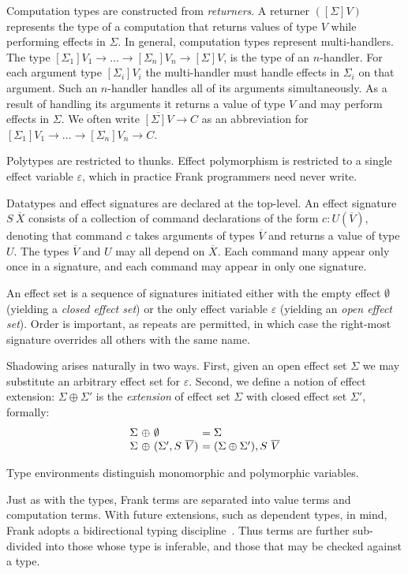\documentclass[preprint]{sigplanconf}
\newcommand{\many}{\overline}
\newcommand\ba{\begin{array}}
\newcommand\ea{\end{array}}
\newcommand{\sig}{S}
\newcommand{\sigs}{\Sigma}
\newcommand{\effbox}[1]{[#1]}
\begin{document}
Computation types are constructed from \emph{returners}.  A returner
$(\effbox{\sigs}V)$ represents the type of a computation that returns
values of type $V$ while performing effects in $\sigs$.
%
In general, computation types represent multi-handlers. The type
$\effbox{\sigs_1}V_1 \to \dots \to \effbox{\sigs_n}V_n \to
\effbox{\sigs}V$,
%
is the type of an $n$-handler. For each argument type
$\effbox{\sigs_i}V_i$ the multi-handler must handle effects in
$\sigs_i$ on that argument. Such an $n$-handler handles all of its
arguments simultaneously. As a result of handling its arguments it
returns a value of type $V$ and may perform effects in $\sigs$.
%
We often write $\many{\effbox{\sigs}V} \to C$ as an abbreviation for
$\effbox{\sigs_1}V_1 \to \dots \to \effbox{\sigs_n}V_n \to C$.

Polytypes are restricted to thunks. Effect polymorphism is restricted
to a single effect variable $\varepsilon$, which in practice Frank
programmers need never write.

Datatypes and effect signatures are declared at the top-level. An
effect signature $S~\many{X}$ consists of a collection of command
declarations of the form $c:U(\many{V})$, denoting that command $c$
takes arguments of types $\many{V}$ and returns a value of type
$U$. The types $\many{V}$ and $U$ may all depend on $\many{X}$. Each
command many appear only once in a signature, and each command may
appear in only one signature.

An effect set is a sequence of signatures initiated either with the
empty effect $\emptyset$ (yielding a \emph{closed effect set}) or the
only effect variable $\varepsilon$ (yielding an \emph{open effect
  set}). Order is important, as repeats are permitted, in which case
the right-most signature overrides all others with the same name.

Shadowing arises naturally in two ways. First, given an open effect
set $\sigs$ we may substitute an arbitrary effect set for
$\varepsilon$. Second, we define a notion of effect extension: $\sigs
\oplus \sigs'$ is the \emph{extension} of effect set $\sigs$ with
closed effect set $\sigs'$, formally:
%
\[\ba{@{\sigs~\oplus~}l@{~}l@{}}
\emptyset               &= \sigs \\
(\sigs', \sig~\many{V}) &= (\sigs \oplus \sigs'), \sig~\many{V} \\
\ea\]

Type environments distinguish monomorphic and polymorphic variables.

Just as with the types, Frank terms are separated into value terms and
computation terms. With future extensions, such as dependent types, in
mind, Frank adopts a bidirectional typing
discipline~\cite{PierceT00}. Thus terms are further sub-divided into
those whose type is inferable, and those that may be checked against a
type.
\end{document}
